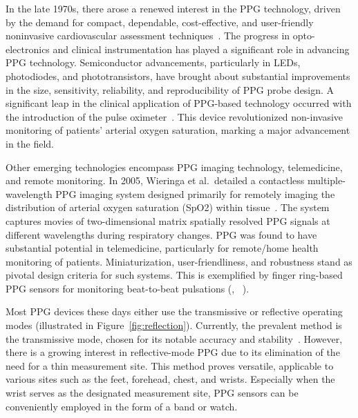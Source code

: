 In the late 1970s, there arose a renewed interest in the PPG technology, driven by the demand for compact, dependable, cost-effective, and user-friendly noninvasive cardiovascular assessment techniques~\cite{yoshiyaSpectrophotometricMonitoringArterial1980}.
The progress in opto-electronics and clinical instrumentation has played a significant role in advancing PPG technology.
Semiconductor advancements, particularly in LEDs, photodiodes, and phototransistors, have brought about substantial improvements in the size, sensitivity, reliability, and reproducibility of PPG probe design.
A significant leap in the clinical application of PPG-based technology occurred with the introduction of the pulse oximeter~\cite{aoyagiPulseOximetryIts2002}.
This device revolutionized non-invasive monitoring of patients' arterial oxygen saturation, marking a major advancement in the field.

Other emerging technologies encompass PPG imaging technology, telemedicine, and remote monitoring.
In 2005, Wieringa et al.\ detailed a contactless multiple-wavelength PPG imaging system designed primarily for remotely imaging the distribution of arterial oxygen saturation (SpO2) within tissue~\cite{wieringaContactlessMultipleWavelength2005b}.
The system captures movies of two-dimensional matrix spatially resolved PPG signals at different wavelengths during respiratory changes.
PPG was found to have substantial potential in telemedicine, particularly for remote/home health monitoring of patients.
Miniaturization, user-friendliness, and robustness stand as pivotal design criteria for such systems.
This is exemplified by finger ring-based PPG sensors for monitoring beat-to-beat pulsations (\cite{rheeArtifactresistantPowerefficientDesign2001}, ~\cite{zhengRingtypeDeviceNoninvasive2003}).

Most PPG devices these days either use the transmissive or reflective operating modes (illustrated in Figure~\ref{fig:reflection}).
Currently, the prevalent method is the transmissive mode, chosen for its notable accuracy and stability~\cite{leeReflectancePulseOximetry2016}.
However, there is a growing interest in reflective-mode PPG due to its elimination of the need for a thin measurement site.
This method proves versatile, applicable to various sites such as the feet, forehead, chest, and wrists.
Especially when the wrist serves as the designated measurement site, PPG sensors can be conveniently employed in the form of a band or watch.

